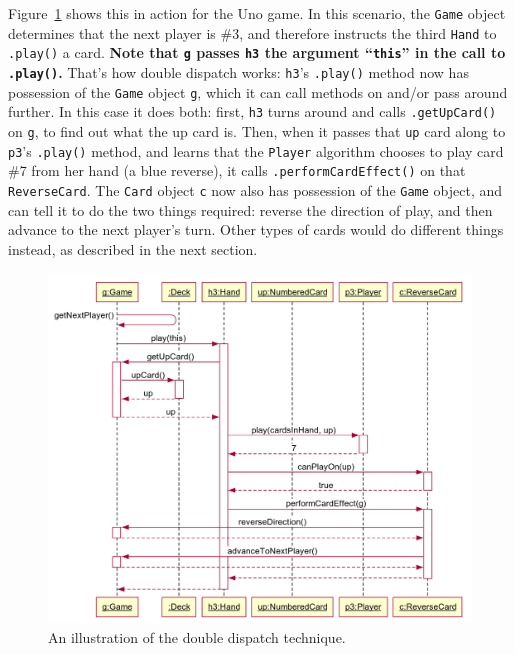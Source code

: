 Figure~\ref{fig:doubleDispatchUno} shows this in action for the Uno game. In
this scenario, the \texttt{Game} object determines that the next player is \#3,
and therefore instructs the third \texttt{Hand} to \texttt{.play()} a card.
\textbf{Note that \texttt{g} passes \texttt{h3} the argument ``\texttt{this}''
in the call to \texttt{.play()}.} That's how double dispatch works:
\texttt{h3}'s \texttt{.play()} method now has possession of the \texttt{Game}
object \texttt{g}, which it can call methods on and/or pass around further. In
this case it does both: first, \texttt{h3} turns around and calls
\texttt{.getUpCard()} on \texttt{g}, to find out what the up card is. Then,
when it passes that \texttt{up} card along to \texttt{p3}'s \texttt{.play()}
method, and learns that the \texttt{Player} algorithm chooses to play card \#7
from her hand (a blue reverse), it calls \texttt{.performCardEffect()} on that
\texttt{ReverseCard}. The \texttt{Card} object \texttt{c} now also has
possession of the \texttt{Game} object, and can tell it to do the two things
required: reverse the direction of play, and then advance to the next player's
turn. Other types of cards would do different things instead, as described
in the next section.

\begin{figure}[hb]
\centering
\includegraphics[width=1\textwidth]{doubleDispatchUno.png}
\medskip
\caption{An illustration of the double dispatch technique.}
\label{fig:doubleDispatchUno}
\end{figure}

